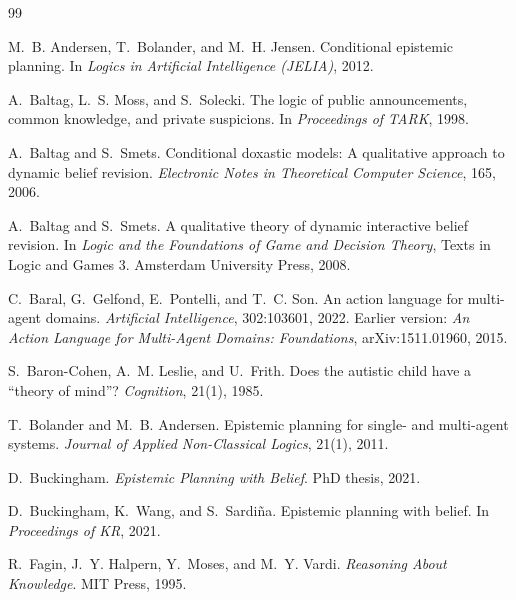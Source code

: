 \documentclass[11pt,a4paper]{article}
\begin{document}
\begin{thebibliography}{99}

M.~B. Andersen, T.~Bolander, and M.~H. Jensen.
\newblock Conditional epistemic planning.
\newblock In \emph{Logics in Artificial Intelligence (JELIA)}, 2012.

A.~Baltag, L.~S. Moss, and S.~Solecki.
\newblock The logic of public announcements, common knowledge, and private suspicions.
\newblock In \emph{Proceedings of TARK}, 1998.

A.~Baltag and S.~Smets.
\newblock Conditional doxastic models: A qualitative approach to dynamic belief revision.
\newblock \emph{Electronic Notes in Theoretical Computer Science}, 165, 2006.

A.~Baltag and S.~Smets.
\newblock A qualitative theory of dynamic interactive belief revision.
\newblock In \emph{Logic and the Foundations of Game and Decision Theory}, Texts in Logic and
Games 3. Amsterdam University Press, 2008.

C.~Baral, G.~Gelfond, E.~Pontelli, and T.~C. Son.
\newblock An action language for multi-agent domains.
\newblock \emph{Artificial Intelligence}, 302:103601, 2022.
\newblock Earlier version: \emph{An Action Language for Multi-Agent Domains:
Foundations}, arXiv:1511.01960, 2015.

S.~Baron-Cohen, A.~M. Leslie, and U.~Frith.
\newblock Does the autistic child have a ``theory of mind''?
\newblock \emph{Cognition}, 21(1), 1985.

T.~Bolander and M.~B. Andersen.
\newblock Epistemic planning for single- and multi-agent systems.
\newblock \emph{Journal of Applied Non-Classical Logics}, 21(1), 2011.

D.~Buckingham.
\newblock \emph{Epistemic Planning with Belief}.
\newblock PhD thesis, 2021.

D.~Buckingham, K.~Wang, and S.~Sardi\~{n}a.
\newblock Epistemic planning with belief.
\newblock In \emph{Proceedings of KR}, 2021.

R.~Fagin, J.~Y. Halpern, Y.~Moses, and M.~Y. Vardi.
\newblock \emph{Reasoning About Knowledge}.
\newblock MIT Press, 1995.


\end{thebibliography}
\end{document}

